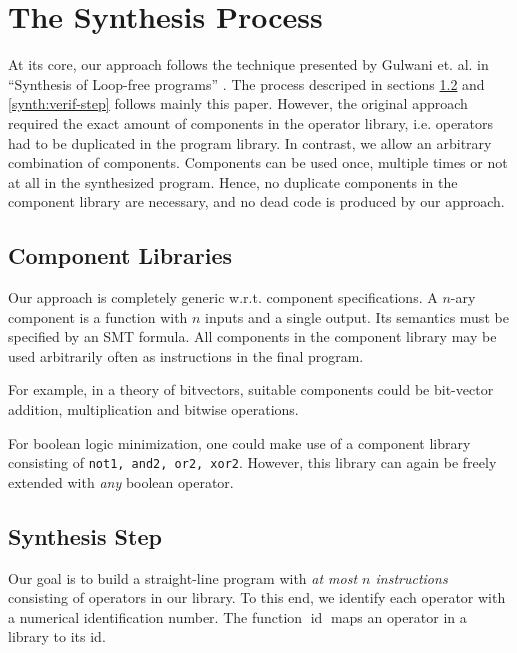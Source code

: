 \documentclass[a4paper]{article}
\DeclareMathOperator*{\id}{id}
\begin{document}
\section{The Synthesis Process}

At its core, our approach follows the technique presented by Gulwani et. al. in ``Synthesis of Loop-free programs'' \cite{DBLP:conf/pldi/GulwaniJTV11}. The process descriped in sections \ref{synth:synth-step} and \ref{synth:verif-step} follows mainly this paper.
However, the original approach required the exact amount of components in the operator library, i.e. operators had to be duplicated in the program library. 
In contrast, we allow an arbitrary combination of components. Components can be used once, multiple times or not at all in the synthesized program. Hence, no duplicate components in the component library are necessary, and no dead code is produced by our approach. 

\subsection{Component Libraries}

  Our approach is completely generic w.r.t. component specifications.
  A $n$-ary component is a function with $n$ inputs and a single output. Its semantics must be specified by an SMT formula. All components in the component library may be used arbitrarily often as instructions in the final program.

  For example, in a theory of bitvectors, suitable components could be bit-vector addition, multiplication and bitwise operations.

  For boolean logic minimization, one could make use of a component library consisting of \verb!not1, and2, or2, xor2!. However, this library can again be freely extended with \emph{any} boolean operator.

\subsection{Synthesis Step} \label{synth:synth-step}

Our goal is to build a straight-line program with \emph{at most $n$ instructions} consisting of operators in our library. To this end, we identify each operator with a numerical identification number. The function $\id$ maps an operator in a library to its id.
\end{document}
